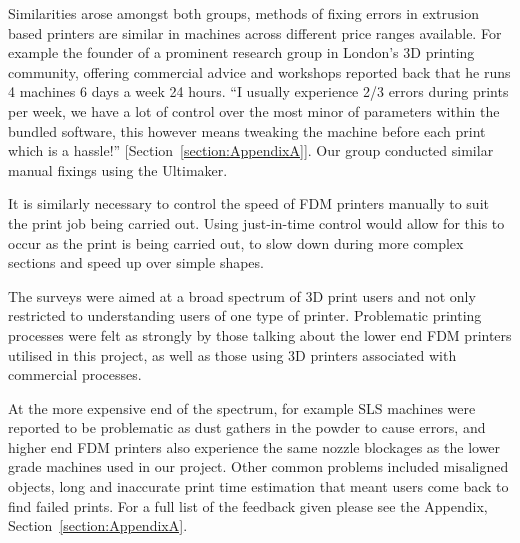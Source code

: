 \documentclass[11pt]{report} %
\begin{document}
Similarities arose amongst both groups, methods of fixing errors in extrusion based printers are similar in machines across different price ranges available. For example the founder of a prominent research group in London's 3D printing community, offering commercial advice and workshops reported back that he runs 4 machines 6 days a week 24 hours. ``I usually experience 2/3 errors during prints per week, we have a lot of control over the most minor of parameters within the bundled software, this however means tweaking the machine before each print which is a hassle!'' [Section~\ref{section:AppendixA}]. Our group conducted similar manual fixings using the Ultimaker. 

It is similarly necessary to control the speed of FDM printers manually to suit the print job being carried out. Using just-in-time control would allow for this to occur as the print is being carried out, to slow down during more complex sections and speed up  over simple shapes. 
 
The surveys were aimed at a broad spectrum of 3D print users and not only restricted to understanding users of one type of printer. Problematic printing processes were felt as strongly by those talking about the lower end FDM printers utilised in this project, as well as those using 3D printers associated with commercial processes. 

At the more expensive end of the spectrum, for example SLS machines were reported to be problematic as dust gathers in the powder to cause errors, and higher end FDM printers also experience the same nozzle blockages as the lower grade machines used in our project. Other common problems included misaligned objects, long and inaccurate print time estimation that meant users come back to find failed prints. For a full list of the feedback given please see the Appendix, Section~\ref{section:AppendixA}.
\end{document}
